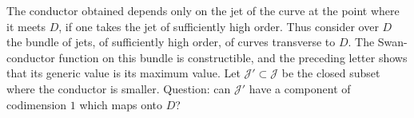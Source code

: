 \documentclass[11pt]{article}
\begin{document}
The conductor obtained depends only on the jet of the curve at the point where it meets \(D\), if one takes the jet of sufficiently high order. Thus consider over \(D\) the bundle of jets, of sufficiently high order, of curves transverse to \(D\). The Swan-conductor function on this bundle is constructible, and the preceding letter shows that its generic value is its maximum value. Let \(\mathcal J'\subset\mathcal J\) be the closed subset where the conductor is smaller. Question: can \(\mathcal J'\) have a component of codimension \(1\) which maps onto \(D\)?
\end{document}
